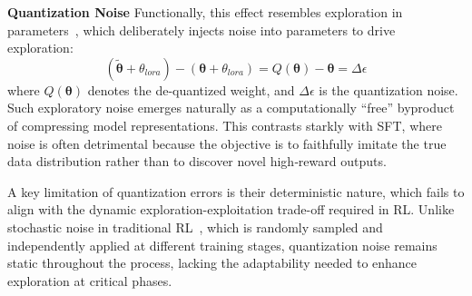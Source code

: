 \textbf{Quantization Noise}
Functionally, this effect resembles exploration in parameters~\citep{eberhard2023pink,plappert2017parameter}, which deliberately injects noise into parameters to drive exploration:
\begin{equation}\label{eq:quantization}
(\mathbf{\tilde{\theta}}+\theta_{lora})-(\mathbf{\theta}+\theta_{lora})=Q(\mathbf{\theta})-\mathbf{\theta}=\Delta\epsilon
\end{equation}
where $Q(\mathbf{\theta})$ denotes the de-quantized weight, and $\Delta\epsilon$ is the quantization noise. Such exploratory noise emerges naturally as a computationally “free” byproduct of compressing model representations. This contrasts starkly with SFT, where noise is often detrimental because the objective is to faithfully imitate the true data distribution rather than to discover novel high‑reward outputs.




A key limitation of quantization errors is their deterministic nature, which fails to align with the dynamic exploration-exploitation trade-off required in RL. Unlike stochastic noise in traditional RL~\citep{plappert2017parameter,osband2016deep}, which is randomly sampled and independently applied at different training stages, quantization noise remains static throughout the process, lacking the adaptability needed to enhance exploration at critical phases.


